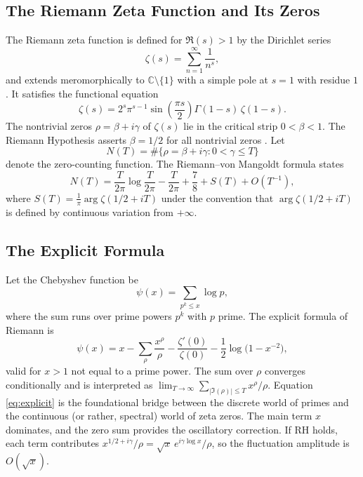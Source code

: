 \documentclass[12pt,a4paper]{article}
\theoremstyle{remark}
\newcommand{\C}{\mathbb{C}}
\begin{document}
\subsection{The Riemann Zeta Function and Its Zeros}
\label{sec:zeta}
The Riemann zeta function is defined for $\Re(s) > 1$ by the Dirichlet series
\cite{Riemann1859}
\[
\zeta(s) = \sum_{n=1}^{\infty} \frac{1}{n^{s}},
\]
and extends meromorphically to $\C\setminus\{1\}$ with a simple pole at
$s=1$ with residue $1$. It satisfies the functional equation
\[
\zeta(s) = 2^{s}\pi^{s-1}\sin\!\left(\frac{\pi s}{2}\right)
\Gamma(1-s)\,\zeta(1-s).
\]
The nontrivial zeros $\rho = \beta + i\gamma$ of $\zeta(s)$ lie in the
critical strip $0 < \beta < 1$. The Riemann Hypothesis asserts
$\beta = 1/2$ for all nontrivial zeros \cite{Riemann1859, Bombieri2000}.
Let
\[
N(T) = \#\{\rho = \beta + i\gamma : 0 < \gamma \leq T\}
\]
denote the zero-counting function. The Riemann--von Mangoldt formula
\cite{vonMangoldt1905} states
\[
N(T) = \frac{T}{2\pi}\log\frac{T}{2\pi} - \frac{T}{2\pi}
+ \frac78 + S(T) + O\!\left(T^{-1}\right),
\]
where $S(T) = \frac{1}{\pi}\arg\zeta(1/2 + iT)$ under the convention that
$\arg\zeta(1/2 + iT)$ is defined by continuous variation from $+\infty$.
\subsection{The Explicit Formula}
\label{sec:explicit}
Let the Chebyshev function be
\[
\psi(x) = \sum_{p^{k} \leq x} \log p,
\]
where the sum runs over prime powers $p^{k}$ with $p$ prime. The explicit
formula of Riemann \cite{Riemann1859, vonMangoldt1905} is
\begin{equation}
\label{eq:explicit}
\psi(x) = x - \sum_{\rho} \frac{x^{\rho}}{\rho}
- \frac{\zeta'(0)}{\zeta(0)} - \frac12 \log\!\bigl(1 - x^{-2}\bigr),
\end{equation}
valid for $x > 1$ not equal to a prime power. The sum over $\rho$ converges
conditionally and is interpreted as $\lim_{T\to\infty}
\sum_{|\Im(\rho)| \leq T} x^{\rho}/\rho$.
Equation \eqref{eq:explicit} is the foundational bridge between the discrete
world of primes and the continuous (or rather, spectral) world of zeta
zeros. The main term $x$ dominates, and the zero sum provides the
oscillatory correction. If RH holds, each term contributes
$x^{1/2 + i\gamma}/\rho = \sqrt{x}\, e^{i\gamma\log x}/\rho$, so the
fluctuation amplitude is $O(\sqrt{x})$.
\end{document}
